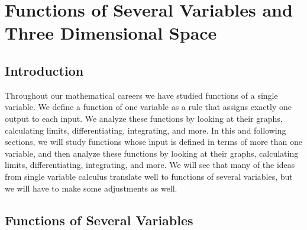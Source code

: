 \section{Functions of Several Variables and Three Dimensional Space} \label{S:9.1.Functions}

\vspace*{-14 pt}

\subsection*{Introduction}

Throughout our mathematical careers we have studied functions of a
single variable. We define a function of one variable as a rule that
assigns exactly one output to each input. We analyze these functions
by looking at their graphs, calculating limits, differentiating,
integrating, and more. In this and following sections, we will study
functions whose input is defined in terms of more than one variable,
and then analyze these functions by looking at their graphs,
calculating limits, differentiating, integrating, and more. We will
see that many of the ideas from single variable calculus translate
well to functions of several variables, but we will have to make some
adjustments as well.



\subsection*{Functions of Several Variables}

